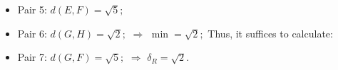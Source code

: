 \documentclass[mathserif]{beamer}
\begin{document}
{\begin{figure}
	      \end{figure}

\begin{footnotesize}
\begin{itemize}
 \item Pair 5: $d(E,F) = \sqrt{5};$
 \item Pair 6: $d(G,H) = \sqrt{2};$ $\Rightarrow$    $\min = \sqrt{2}; $ Thus, it suffices to calculate:
 \item Pair 7: $d(G,F) = \sqrt{5};$  $\Rightarrow$   $\delta_R = \sqrt{2}$.
\end{itemize}
\end{footnotesize}
}
\end{document}
